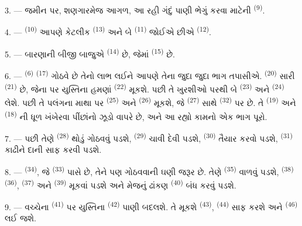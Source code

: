 3. --- જમીન પર, શણગારમેજ આગળ, આ રહી ગંદું પાણી ભેગું કરવા માટેની
 \textsuperscript{(9)}.

4. ---  \textsuperscript{(10)} આપણે કેટલીક
 \textsuperscript{(13)} અને બે 
\textsuperscript{(11)} જોઈએ છીએ 
\textsuperscript{(12)}.

5. --- બારણાની બીજી બાજુએ 
\textsuperscript{(14)} છે, જેમાં  \textsuperscript{(15)}
છે.

6. ---  \textsuperscript{(6)} 
\textsuperscript{(17)} ગોઠવે છે તેનો લાભ લઈને આપણે તેના જુદા જુદા ભાગ
તપાસીએ.  \textsuperscript{(20)} સારી
 \textsuperscript{(21)} છે, જેના પર યુસ્તિના
હમણાં  \textsuperscript{(22)} મૂકશે. પછી તે
ખુરશીઓ પરથી બે  \textsuperscript{(23)} અને
 \textsuperscript{(24)} લેશે. પછી તે પલંગના માથા પર
 \textsuperscript{(25)} અને 
\textsuperscript{(26)} મૂકશે, જે  \textsuperscript{(27)}
સાથે  \textsuperscript{(32)} પર છે. તે
 \textsuperscript{(19)} અને 
\textsuperscript{(18)} ની ધૂળ ખંખેરવા પીંછાંનો ઝૂડો વાપરે છે, અને આ
રહ્યો કામનો એક ભાગ પૂરો.

7. --- પછી તેણે  \textsuperscript{(28)}
થોડું ગોઠવવું પડશે,  \textsuperscript{(29)}
ચાવી દેવી પડશે,  \textsuperscript{(30)} તૈયાર
કરવો પડશે,  \textsuperscript{(31)} કાઢીને દાની સાફ
કરવી પડશે.

\VUsaut{5.0mm}
\VUsaut{3.0mm}

8. ---  \textsuperscript{(34)}, જે 
\textsuperscript{(33)} પાસે છે, તેને પણ ગોઠવવાની ઘણી જરૂર છે. તેણે
 \textsuperscript{(35)} વાળવું પડશે,  \textsuperscript{(38)} 
 \textsuperscript{(36)},  \textsuperscript{(37)}
અને  \textsuperscript{(39)} મૂકવાં પડશે અને મેજનું ઢાંકણ
 \textsuperscript{(40)} બંધ કરવું પડશે.

9. --- વચ્ચેના  \textsuperscript{(41)} પર
યુસ્તિના  \textsuperscript{(42)} પાણી બદલશે.
તે  મૂકશે  \textsuperscript{(43)},
 \textsuperscript{(44)} સાફ કરશે અને
 \textsuperscript{(46)} લઈ જશે.

